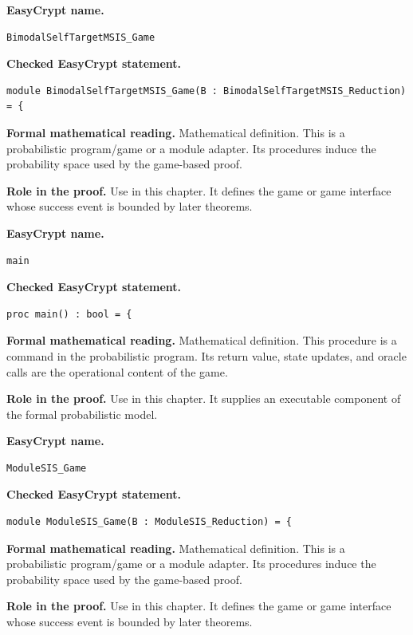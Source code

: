 \begin{formaldefinition}
\noindent\textbf{EasyCrypt name.}
\begin{lstlisting}[language=EasyCrypt,basicstyle=\ttfamily\scriptsize]
BimodalSelfTargetMSIS_Game
\end{lstlisting}
\noindent\textbf{Checked EasyCrypt statement.}
\begin{lstlisting}[language=EasyCrypt,basicstyle=\ttfamily\scriptsize]
module BimodalSelfTargetMSIS_Game(B : BimodalSelfTargetMSIS_Reduction) = {
\end{lstlisting}
\noindent\textbf{Formal mathematical reading.}
Mathematical definition. This is a probabilistic program/game or a module adapter.  Its procedures induce the probability space used by the game-based proof.

\noindent\textbf{Role in the proof.}
Use in this chapter. It defines the game or game interface whose success event is bounded by later theorems.

\end{formaldefinition}

\begin{formaldefinition}
\noindent\textbf{EasyCrypt name.}
\begin{lstlisting}[language=EasyCrypt,basicstyle=\ttfamily\scriptsize]
main
\end{lstlisting}
\noindent\textbf{Checked EasyCrypt statement.}
\begin{lstlisting}[language=EasyCrypt,basicstyle=\ttfamily\scriptsize]
proc main() : bool = {
\end{lstlisting}
\noindent\textbf{Formal mathematical reading.}
Mathematical definition. This procedure is a command in the probabilistic program.  Its return value, state updates, and oracle calls are the operational content of the game.

\noindent\textbf{Role in the proof.}
Use in this chapter. It supplies an executable component of the formal probabilistic model.

\end{formaldefinition}

\begin{formaldefinition}
\noindent\textbf{EasyCrypt name.}
\begin{lstlisting}[language=EasyCrypt,basicstyle=\ttfamily\scriptsize]
ModuleSIS_Game
\end{lstlisting}
\noindent\textbf{Checked EasyCrypt statement.}
\begin{lstlisting}[language=EasyCrypt,basicstyle=\ttfamily\scriptsize]
module ModuleSIS_Game(B : ModuleSIS_Reduction) = {
\end{lstlisting}
\noindent\textbf{Formal mathematical reading.}
Mathematical definition. This is a probabilistic program/game or a module adapter.  Its procedures induce the probability space used by the game-based proof.

\noindent\textbf{Role in the proof.}
Use in this chapter. It defines the game or game interface whose success event is bounded by later theorems.

\end{formaldefinition}


